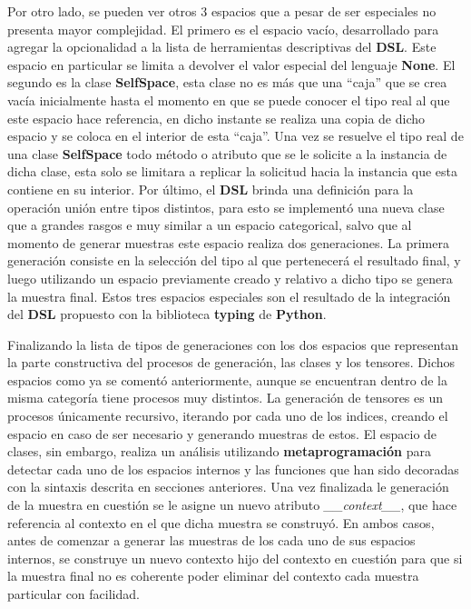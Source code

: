Por otro lado, se pueden ver otros 3 espacios que a pesar de ser especiales no presenta mayor complejidad. El primero es el
espacio vacío, desarrollado para agregar la opcionalidad a la lista de herramientas descriptivas del {\bf DSL}. Este espacio en
particular se limita a devolver el valor especial del lenguaje {\bf None}. El segundo es la clase {\bf SelfSpace}, esta clase no es
más que una ``caja'' que se crea vacía inicialmente hasta el momento en que se puede conocer el tipo real al que este espacio hace
referencia, en dicho instante se realiza una copia de dicho espacio y se coloca en el interior de esta ``caja''. Una vez se resuelve
el tipo real de una clase {\bf SelfSpace} todo método o atributo que se le solicite a la instancia de dicha clase, esta solo se
limitara a replicar la solicitud hacia la instancia que esta contiene en su interior. Por último, el {\bf DSL} brinda una definición
para la operación unión entre tipos distintos, para esto se implementó una nueva clase que a grandes rasgos e muy similar a un espacio
categorical, salvo que al momento de generar muestras este espacio realiza dos generaciones. La primera generación consiste en la
selección del tipo al que pertenecerá el resultado final, y luego utilizando un espacio previamente creado y relativo a dicho tipo
se genera la muestra final. Estos tres espacios especiales son el resultado de la integración del {\bf DSL} propuesto con la biblioteca
    {\bf typing} de {\bf Python}.

Finalizando la lista de tipos de generaciones con los dos espacios que representan la parte constructiva del procesos de generación,
las clases y los tensores. Dichos espacios como ya se comentó anteriormente, aunque se encuentran dentro de la misma categoría tiene
procesos muy distintos. La generación de tensores es un procesos únicamente recursivo, iterando por cada uno de los indices, creando
el espacio en caso de ser necesario y generando muestras de estos. El espacio de clases, sin embargo, realiza un análisis utilizando
    {\bf metaprogramación} para detectar cada uno de los espacios internos y las funciones que han sido decoradas con la sintaxis descrita en
secciones anteriores. Una vez finalizada le generación de la muestra en cuestión se le asigne un nuevo atributo {\it \_\_context\_\_},
que hace referencia al contexto en el que dicha muestra se construyó. En ambos casos, antes de comenzar a generar las muestras de los
cada uno de sus espacios internos, se construye un nuevo contexto hijo del contexto en cuestión para que si la muestra
final no es coherente poder eliminar del contexto cada muestra particular con facilidad.

